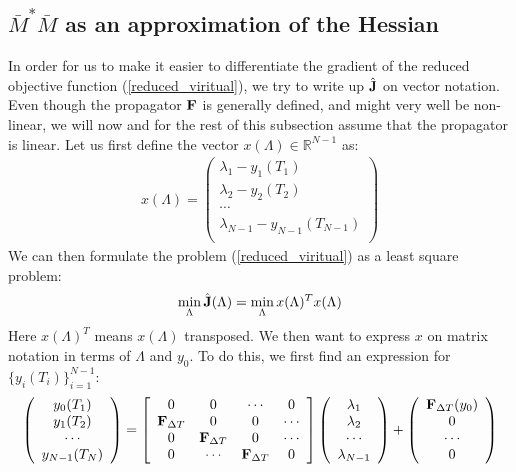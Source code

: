 \subsection{$\bar{M}^{*}\bar{M}$ as an approximation of the Hessian}
In order for us to make it easier to differentiate the gradient of the reduced objective function (\ref{reduced_viritual}), we try to write up $\hat{\bold J}$ on vector notation. Even though the propagator $\bold F$ is generally defined, and might very well be non-linear, we will now and for the rest of this subsection assume that the propagator is linear. Let us first define the vector $x(\Lambda)\in\mathbb{R}^{N-1}$ as:
\begin{align}
x(\Lambda)= \left( \begin{array}{c}  
   \lambda_1 - y_1(T_1) \\ 
   \lambda_2 - y_2(T_2) \\
   \cdots  \\
   \lambda_{N-1} -y_{N-1}(T_{N-1})  \\
   \end{array}  \right)
\end{align} 
We can then formulate the problem (\ref{reduced_viritual}) as a least square problem:
\begin{align}
\min_{\Lambda}\hat{\bold J}(\Lambda) = \min_{\Lambda}x(\Lambda)^Tx(\Lambda) \label{vector_J}  
\end{align}
Here $x(\Lambda)^T$ means $x(\Lambda)$ transposed. We then want to express $x$ on matrix notation in terms of $\Lambda$ and $y_0$. To do this, we first find an expression for $\{y_i(T_i)\}_{i=1}^{N-1}$:
\begin{align}
\left( \begin{array}{c}
   y_0(T_1) \\  
   y_1(T_2) \\ 
   \cdots  \\
   y_{N-1}(T_N)  \\
   \end{array}  \right)= 
   \left[ \begin{array}{cccc}  
   0 & 0 & \cdots & 0 \\ 
   \bold{F}_{\Delta T}&0 & 0  & \cdots \\
   0 &  \bold{F}_{\Delta T}&0 & \cdots \\
   0 &\cdots &\bold{F}_{\Delta T}& 0   \\
   \end{array}  \right]
   \left( \begin{array}{c}
   \lambda_1 \\  
   \lambda_2 \\ 
   \cdots  \\
   \lambda_{N-1}  \\
   \end{array}  \right) + 
   \left( \begin{array}{c}
   \bold{F}_{\Delta T}(y_0)\\  
   0\\ 
   \cdots  \\
   0  \\
   \end{array}  \right)
\end{align}
